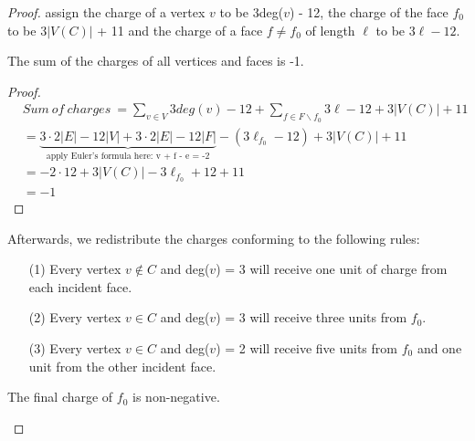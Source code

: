 \begin{proof}

assign the charge of a vertex $v$ to be 3deg($v$) - 12, the charge of the face $f_0$ to be $3|V(C)|$ + 11 and the charge of a face $f \ne f_0$ of length $\ell$ to be $3 \ell - 12$. 
    \begin{claim}
    The sum of the charges of all vertices and faces is -1.
    \end{claim}
    \begin{proof}
        \begin{align*}
            & Sum \ of \ charges \ = \sum_{v \in V}3deg(v) - 12 + \sum_{f \in F \backslash {f_0}} 3\ell - 12 + 3|V(C)| + 11 \\
            &= \underbrace{3 \cdot 2|E| - 12 |V| + 3\cdot2|E| - 12|F|}_{\text{apply Euler's formula here: v + f - e = -2}} - (3\ell_{f_0} - 12) + 3|V(C)| + 11 \\
            &=-2 \cdot 12 + 3|V(C)|- 3\ell_{f_0} + 12 + 11\\
            &= -1
        \end{align*}
    \end{proof}
    Afterwards, we redistribute the charges conforming to the following rules:
    \begin{itemize}
        \item[(1)] Every vertex $v \notin C$ and deg($v$) = 3 will receive one unit of charge from each incident face.
        \item[(2)] Every vertex $v \in C$ and deg($v$) = 3 will receive three units from $f_0$.
        \item[(3)] Every vertex $v \in C$ and deg($v$) = 2 will receive five units from $f_0$ and one unit from the other incident face. 
    \end{itemize}
    
    \begin{claim}
    The final charge of $f_0$ is non-negative.
    \end{claim}
    

\end{proof}
